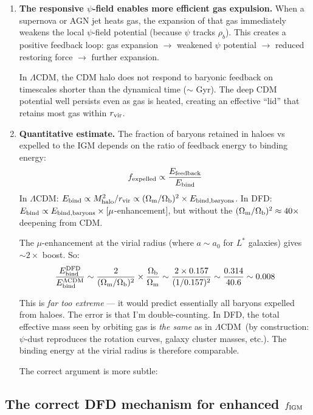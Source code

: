 \documentclass[11pt]{article}
\newcommand{\LCDM}{$\Lambda$CDM}
\newcommand{\Ob}{\Omega_{\rm b}}
\newcommand{\Om}{\Omega_{\rm m}}
\newcommand{\fIGM}{f_{\rm IGM}}
\begin{document}
\begin{enumerate}
\item \textbf{The responsive $\psi$-field enables more efficient gas
  expulsion.}  When a supernova or AGN jet heats gas, the expansion
  of that gas immediately weakens the local $\psi$-field potential
  (because $\psi$ tracks $\rho_b$).  This creates a positive feedback
  loop: gas expansion $\to$ weakened $\psi$ potential $\to$ reduced
  restoring force $\to$ further expansion.

  In \LCDM, the CDM halo does not respond to baryonic feedback on
  timescales shorter than the dynamical time ($\sim$ Gyr).  The deep
  CDM potential well persists even as gas is heated, creating an
  effective ``lid'' that retains most gas within $r_{\rm vir}$.

\item \textbf{Quantitative estimate.}  The fraction of baryons
  retained in haloes vs expelled to the IGM depends on the ratio of
  feedback energy to binding energy:
  \begin{equation}
  f_{\rm expelled} \propto \frac{E_{\rm feedback}}{E_{\rm bind}}
  \end{equation}
  In \LCDM: $E_{\rm bind} \propto M_{\rm halo}^2/r_{\rm vir}
  \propto (\Om/\Ob)^2 \times E_{\rm bind,baryons}$.
  In DFD: $E_{\rm bind} \propto E_{\rm bind,baryons} \times
  [\mu$-enhancement$]$, but without the $(\Om/\Ob)^2 \approx 40\times$
  deepening from CDM.

  The $\mu$-enhancement at the virial radius (where $a \sim a_0$ for
  $L^*$ galaxies) gives $\sim 2\times$ boost.  So:
  \begin{equation}
  \frac{E_{\rm bind}^{\rm DFD}}{E_{\rm bind}^{\rm \Lambda CDM}}
  \sim \frac{2}{(\Om/\Ob)^2} \times \frac{\Ob}{\Om}
  \sim \frac{2 \times 0.157}{(1/0.157)^2}
  \sim \frac{0.314}{40.6}
  \sim 0.008
  \end{equation}

  This is \emph{far too extreme} --- it would predict essentially all
  baryons expelled from haloes.  The error is that I'm double-counting.
  In DFD, the total effective mass seen by orbiting gas is \emph{the
  same} as in \LCDM\ (by construction: $\psi$-dust reproduces the
  rotation curves, galaxy cluster masses, etc.).  The binding energy
  at the virial radius is therefore comparable.

  The correct argument is more subtle:
\end{enumerate}

\subsection{The correct DFD mechanism for enhanced $\fIGM$}
\end{document}
